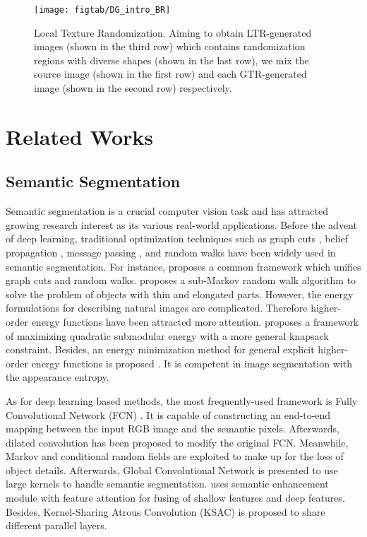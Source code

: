 \documentclass[twocolumn,journal,vlined,ruled,linesnumbered]{IEEEtran}
\begin{document}
\begin{figure*}[tbh]
\begin{centering}
\texttt{[image: figtab/DG\_intro\_BR]}
\par\end{centering}
\caption{Local Texture Randomization. Aiming to obtain LTR-generated images (shown in the third row) which contains randomization regions with diverse shapes (shown in the last row), we mix the source image (shown in the first row) and each GTR-generated image (shown in the second row) respectively.\label{fig:Boundary-Randomization}}
\vspace{-5mm}
\end{figure*}


\section{Related Works}

\subsection{Semantic Segmentation\label{subsec:Semantic-Segmentation}}

Semantic segmentation is a crucial computer vision task and has attracted growing research interest as its various real-world applications. Before the advent of deep learning, traditional optimization techniques such as graph cuts \cite{kolmogorov2004energy}, belief propagation \cite{meltzer2005globally}, message passing \cite{kolmogorov2014new}, and random walks \cite{grady2004multi} have been widely used in semantic segmentation. For instance, \cite{sinop2007seeded} proposes a common framework which unifies graph cuts and random walks. \cite{dong2015sub} proposes a sub-Markov random walk algorithm to solve the problem of objects with thin and elongated parts. However, the energy formulations for describing natural images are complicated. Therefore higher-order energy functions \cite{blake2011markov} have been attracted more attention. \cite{shen2019submodular} proposes a framework of maximizing quadratic submodular energy with a more general knapsack constraint. Besides, an energy minimization method for general explicit higher-order energy functions is proposed \cite{shen2017higher}. It is competent in image segmentation with the appearance entropy.

As for deep learning based methods, the most frequently-used framework is Fully Convolutional Network (FCN) \cite{long2015fully}. It is capable of constructing an end-to-end mapping between the input RGB image and the semantic pixels. Afterwards, dilated convolution \cite{yu2015multi} has been proposed to modify the original FCN. Meanwhile, Markov and conditional random fields \cite{chen2014semantic,liu2015semantic,zheng2015conditional} are exploited to make up for the loss of object details. Afterwards, Global Convolutional Network \cite{peng2017large} is presented to use large kernels to handle semantic segmentation. \cite{pang2019towards} uses semantic enhancement module with feature attention for fusing of shallow features and deep features. Besides, Kernel-Sharing Atrous Convolution (KSAC) \cite{huang2019see} is proposed to share different parallel layers.
\end{document}
